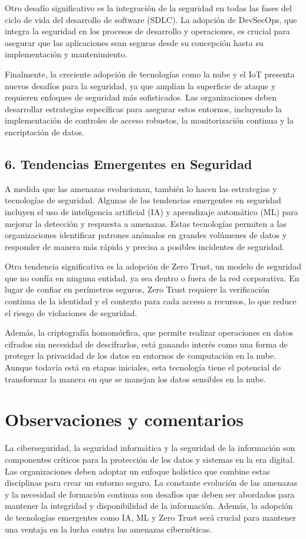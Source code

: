 \documentclass[12pt]{article}
\begin{document}
Otro desafío significativo es la integración de la seguridad en todas las fases del ciclo de vida del desarrollo de software (SDLC). La adopción de DevSecOps, que integra la seguridad en los procesos de desarrollo y operaciones, es crucial para asegurar que las aplicaciones sean seguras desde su concepción hasta su implementación y mantenimiento.

Finalmente, la creciente adopción de tecnologías como la nube y el IoT presenta nuevos desafíos para la seguridad, ya que amplían la superficie de ataque y requieren enfoques de seguridad más sofisticados. Las organizaciones deben desarrollar estrategias específicas para asegurar estos entornos, incluyendo la implementación de controles de acceso robustos, la monitorización continua y la encriptación de datos.

\subsection*{6. Tendencias Emergentes en Seguridad}
A medida que las amenazas evolucionan, también lo hacen las estrategias y tecnologías de seguridad. Algunas de las tendencias emergentes en seguridad incluyen el uso de inteligencia artificial (IA) y aprendizaje automático (ML) para mejorar la detección y respuesta a amenazas. Estas tecnologías permiten a las organizaciones identificar patrones anómalos en grandes volúmenes de datos y responder de manera más rápida y precisa a posibles incidentes de seguridad.

Otra tendencia significativa es la adopción de Zero Trust, un modelo de seguridad que no confía en ninguna entidad, ya sea dentro o fuera de la red corporativa. En lugar de confiar en perímetros seguros, Zero Trust requiere la verificación continua de la identidad y el contexto para cada acceso a recursos, lo que reduce el riesgo de violaciones de seguridad.

Además, la criptografía homomórfica, que permite realizar operaciones en datos cifrados sin necesidad de descifrarlos, está ganando interés como una forma de proteger la privacidad de los datos en entornos de computación en la nube. Aunque todavía está en etapas iniciales, esta tecnología tiene el potencial de transformar la manera en que se manejan los datos sensibles en la nube.

\section*{Observaciones y comentarios}
La ciberseguridad, la seguridad informática y la seguridad de la información son componentes críticos para la protección de los datos y sistemas en la era digital. Las organizaciones deben adoptar un enfoque holístico que combine estas disciplinas para crear un entorno seguro. La constante evolución de las amenazas y la necesidad de formación continua son desafíos que deben ser abordados para mantener la integridad y disponibilidad de la información. Además, la adopción de tecnologías emergentes como IA, ML y Zero Trust será crucial para mantener una ventaja en la lucha contra las amenazas cibernéticas.
\end{document}
